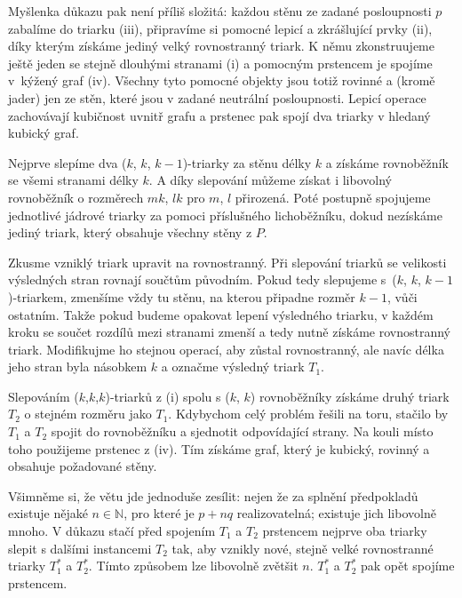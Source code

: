 Myšlenka důkazu pak není příliš složitá: každou stěnu ze zadané posloupnosti $p$ zabalíme do triarku (iii), připravíme si pomocné lepicí a zkrášlující prvky (ii), díky kterým získáme jediný velký rovnostranný triark. K němu zkonstruujeme ještě jeden se stejně dlouhými stranami (i) a pomocným prstencem je spojíme v~kýžený graf (iv). Všechny tyto pomocné objekty jsou totiž rovinné a (kromě jader) jen ze stěn, které jsou v zadané neutrální posloupnosti. Lepicí operace zachovávají kubičnost uvnitř grafu a prstenec pak spojí dva triarky v hledaný kubický graf.
\begin{dukaz}
Nejprve slepíme dva ($k$, $k$, $k-1$)-triarky za stěnu délky $k$ a získáme rovnoběžník se všemi stranami délky $k$. A díky slepování můžeme získat i libovolný rovnoběžník o rozměrech $mk$, $lk$ pro $m$, $l$ přirozená. Poté postupně spojujeme jednotlivé jádrové triarky za pomoci příslušného lichoběžníku, dokud nezískáme jediný triark, který obsahuje všechny stěny z $P$.

Zkusme vzniklý triark upravit na rovnostranný. Při slepování triarků se velikosti výsledných stran rovnají součtům původním. Pokud tedy slepujeme s~($k$, $k$, $k-1$)-triarkem, zmenšíme vždy tu stěnu, na kterou připadne rozměr $k-1$, vůči ostatním. Takže pokud budeme opakovat lepení výsledného triarku, v každém kroku se součet rozdílů mezi stranami zmenší a tedy nutně získáme rovnostranný triark. Modifikujme ho stejnou operací, aby zůstal rovnostranný, ale navíc délka jeho stran byla násobkem $k$ a označme výsledný triark $T_1$.

Slepováním ($k$,$k$,$k$)-triarků z (i) spolu s ($k$, $k$) rovnoběžníky získáme druhý triark $T_2$ o stejném rozměru jako $T_1$. Kdybychom celý problém řešili na toru, stačilo by $T_1$ a $T_2$ spojit do rovnoběžníku a sjednotit odpovídající strany. Na kouli místo toho použijeme prstenec z (iv). Tím získáme graf, který je kubický, rovinný a obsahuje požadované stěny. 
\end{dukaz}

Všimněme si, že větu jde jednoduše zesílit: nejen že za splnění předpokladů existuje nějaké $n \in \mathbb{N}$, pro které je $p+nq$ realizovatelná; existuje jich libovolně mnoho. V důkazu stačí před spojením $T_1$ a $T_2$ prstencem nejprve oba triarky slepit s dalšími instancemi $T_2$ tak, aby vznikly nové, stejně velké rovnostranné triarky $T_{1}^*$ a $T_{2}^*$. Tímto způsobem lze libovolně zvětšit $n$. $T_{1}^*$ a $T_{2}^*$ pak opět spojíme prstencem.